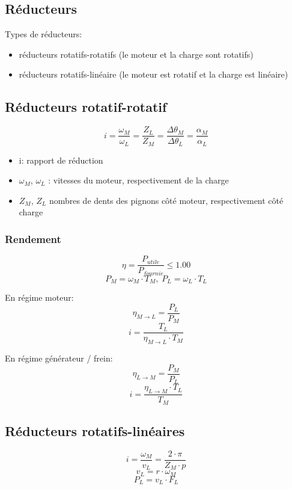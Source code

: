 \documentclass[10pt]{article} %
\begin{document}
\begin{multicols}{3}
	\section*{Réducteurs}
		
		Types de réducteurs:
		
		\begin{itemize}
			\item réducteurs rotatifs-rotatifs (le moteur et la charge sont rotatifs)
			\item réducteurs rotatifs-linéaire (le moteur est rotatif et la charge est linéaire)
		\end{itemize}
	
		\subsection*{Réducteurs rotatif-rotatif}
		
		
			\[i = \frac{\omega_M}{\omega_L} = \frac{Z_L}{Z_M} = \frac{\Delta \theta_M}{\Delta \theta_L} = \frac{\alpha_M}{\alpha_L} \]
		
			\begin{itemize}
				\item i: rapport de réduction
				\item $\omega_M$, $\omega_L$ : vitesses du moteur, respectivement de la charge
				\item $Z_M$, $Z_L$ nombres de dents des pignons côté moteur, respectivement côté charge
			\end{itemize}
		
		\subsubsection*{Rendement}
		
			\[\eta = \frac{P_{utile}}{P_{fournie}} \leq 1.00 \]
			\[P_M = \omega_M \cdot T_M,\; P_L= \omega_L \cdot T_L \]
			
			En régime moteur:
			\[\eta_{M \rightarrow L} = \frac{P_L}{P_M} \]
			\[i = \frac{T_L}{\eta_{M \rightarrow L} \cdot T_M} \]
			
			En régime générateur / frein:
			\[\eta_{L \rightarrow M} = \frac{P_M}{P_L} \]
			\[i = \frac{\eta_{L \rightarrow M} \cdot T_L}{T_M} \]
		
		\subsection*{Réducteurs rotatifs-linéaires}
		
			\[i = \frac{\omega_M}{v_L} = \frac{2 \cdot \pi}{Z_M \cdot p} \]
			\[v_L = r \cdot \omega_M \]
			\[P_L = v_L \cdot F_L \]
			

\end{multicols}
\end{document}

